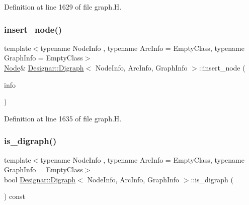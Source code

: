 Definition at line 1629 of file graph.\+H.

\mbox{\label{class_designar_1_1_digraph_a6b099922c3891b2c9fce75ffeedba025}} 
\subsubsection{\texorpdfstring{insert\+\_\+node()}{insert\_node()}\hspace{0.1cm}{\footnotesize\ttfamily [4/4]}}
{\footnotesize\ttfamily template$<$typename Node\+Info , typename Arc\+Info  = Empty\+Class, typename Graph\+Info  = Empty\+Class$>$ \\
\hyperlink{class_designar_1_1_digraph_a4dc921c41a480b7946a04170e997d8ae}{Node}\& \hyperlink{class_designar_1_1_digraph}{Designar\+::\+Digraph}$<$ Node\+Info, Arc\+Info, Graph\+Info $>$\+::insert\+\_\+node (\begin{DoxyParamCaption}\item[{Node\+Info \&\&}]{info }\end{DoxyParamCaption})\hspace{0.3cm}{\ttfamily [inline]}}



Definition at line 1635 of file graph.\+H.

\mbox{\label{class_designar_1_1_digraph_a6751952e13a35cf7aa452a8bb243f53d}} 
\subsubsection{\texorpdfstring{is\+\_\+digraph()}{is\_digraph()}}
{\footnotesize\ttfamily template$<$typename Node\+Info , typename Arc\+Info  = Empty\+Class, typename Graph\+Info  = Empty\+Class$>$ \\
bool \hyperlink{class_designar_1_1_digraph}{Designar\+::\+Digraph}$<$ Node\+Info, Arc\+Info, Graph\+Info $>$\+::is\+\_\+digraph (\begin{DoxyParamCaption}{ }\end{DoxyParamCaption}) const\hspace{0.3cm}{\ttfamily [inline]}}



